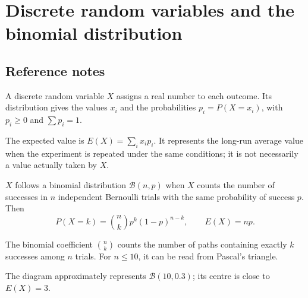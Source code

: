 
\chapter{Discrete random variables and the binomial distribution}
\section{Reference notes}
A discrete random variable $X$ assigns a real number to each outcome. Its distribution gives the values $x_i$ and the probabilities $p_i=P(X=x_i)$, with $p_i\geq0$ and $\sum p_i=1$.

\begin{retenir}
The expected value is $E(X)=\sum_i x_ip_i$. It represents the long-run average value when the experiment is repeated under the same conditions; it is not necessarily a value actually taken by $X$.
\end{retenir}

\begin{center}
\end{center}

\begin{retenir}
$X$ follows a binomial distribution $\mathcal B(n,p)$ when $X$ counts the number of successes in $n$ independent Bernoulli trials with the same probability of success $p$. Then
\[
P(X=k)=\binom nk p^k(1-p)^{n-k},\qquad E(X)=np.
\]
\end{retenir}

The binomial coefficient $\binom nk$ counts the number of paths containing exactly $k$ successes among $n$ trials. For $n\leq10$, it can be read from Pascal's triangle.

\begin{center}
\end{center}
The diagram approximately represents $\mathcal B(10,0.3)$; its centre is close to $E(X)=3$.

